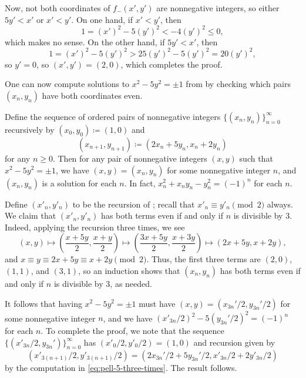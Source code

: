 \documentclass[../notes.tex]{subfiles}
\begin{document}
\begin{solution}
\begin{enumerate}
		Now, not both coordinates of $f_-(x',y')$ are nonnegative integers, so either $5y'<x'$ or $x'<y'$. On one hand, if $x'<y'$, then
		\[1=(x')^2-5(y')^2<-4(y')^2\le0,\]
		which makes no sense. On the other hand, if $5y'<x'$, then
		\[1=(x')^2-5(y')^2>25(y')^2-5(y')^2=20(y')^2,\]
		so $y'=0$, so $(x',y')=(2,0)$, which completes the proof.
		\qedhere
	\end{enumerate}
\end{solution}
One can now compute solutions to $x^2-5y^2=\pm1$ from  by checking which pairs $(x_n,y_n)$ have both coordinates even.
\begin{example}
	Define the sequence of ordered pairs of nonnegative integers $\{(x_n,y_n)\}_{n=0}^\infty$ recursively by $(x_0,y_0)\coloneqq(1,0)$ and
	\[(x_{n+1},y_{n+1})\coloneqq(2x_n+5y_n,x_n+2y_n)\]
	for any $n\ge0$. Then for any pair of nonnegative integers $(x,y)$ such that $x^2-5y^2=\pm1$, we have $(x,y)=(x_n,y_n)$ for some nonnegative integer $n$, and $(x_n,y_n)$ is a solution for each $n$. In fact, $x_n^2+x_ny_n-y_n^2=(-1)^n$ for each $n$.
\end{example}
\begin{solution}
	Define $(x'_n,y'_n)$ to be the recursion of ; recall that $x'_n\equiv y'_n\pmod2$ always. We claim that $(x'_n,y'_n)$ has both terms even if and only if $n$ is divisible by $3$. Indeed, applying the recursion three times, we see
	\begin{equation}
		(x,y)\mapsto\left(\frac{x+5y}2,\frac{x+y}2\right)\mapsto\left(\frac{3x+5y}2,\frac{x+3y}2\right)\mapsto(2x+5y,x+2y), \label{eq:pell-5-three-times}
	\end{equation}
	and $x\equiv y\equiv 2x+5y\equiv x+2y\pmod2$. Thus, the first three terms are $(2,0)$, $(1,1)$, and $(3,1)$, so an induction shows that $(x_n,y_n)$ has both terms even if and only if $n$ is divisible by $3$, as needed.

	It follows that having $x^2-5y^2=\pm1$ must have $(x,y)=(x_{3n}'/2,y_{3n}'/2)$ for some nonnegative integer $n$, and we have $(x'_{3n}/2)^2-5(y_{3n}'/2)^2=(-1)^n$ for each $n$. To complete the proof, we note that the sequence $\{(x'_{3n}/2,y_{3n}')\}_{n=0}^\infty$ has $(x'_0/2,y'_0/2)=(1,0)$ and recursion given by
	\[\left(x'_{3(n+1)}/2,y'_{3(n+1)}/2\right)=\left(2x_{3n}'/2+5y_{3n}'/2,x'_{3n}/2+2y'_{3n}/2\right)\]
	by the computation in \eqref{eq:pell-5-three-times}. The result follows.
\end{solution}
\end{document}
